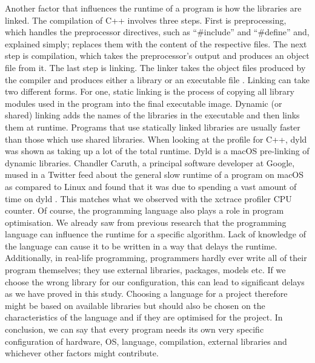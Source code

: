 Another factor that influences the runtime of a program is how the libraries are linked. The compilation of C++ involves three steps. First is preprocessing, which handles the preprocessor directives, such as “\#include” and “\#define” and, explained simply; replaces them with the content of the respective files. The next step is compilation, which takes the preprocessor’s output and produces an object file from it. The last step is linking. The linker takes the object files produced by the compiler and produces either a library or an executable file \cite{linking}. Linking can take two different forms. For one, static linking is the process of copying all library modules used in the program into the final executable image. Dynamic (or shared) linking adds the names of the libraries in the executable and then links them at runtime. Programs that use statically linked libraries are usually faster than those which use shared libraries. When looking at the profile for C++, dyld was shown as taking up a lot of the total runtime. Dyld is a macOS pre-linking of dynamic libraries. Chandler Caruth, a principal software developer at Google, mused in a Twitter feed about the general slow runtime of a program on macOS as compared to Linux and found that it was due to spending a vast amount of time on dyld \cite{twitter}. This matches what we observed with the xctrace profiler CPU counter.
Of course, the programming language also plays a role in program optimisation. We already saw from previous research that the programming language can influence the runtime for a specific algorithm. Lack of knowledge of the language can cause it to be written in a way that delays the runtime. Additionally, in real-life programming, programmers hardly ever write all of their program themselves; they use external libraries, packages, models etc. If we choose the wrong library for our configuration, this can lead to significant delays as we have proved in this study. Choosing a language for a project therefore might be based on available libraries but should also be chosen on the characteristics of the language and if they are optimised for the project. In conclusion, we can say that every program needs its own very specific configuration of hardware, OS, language, compilation, external libraries and whichever other factors might contribute.
